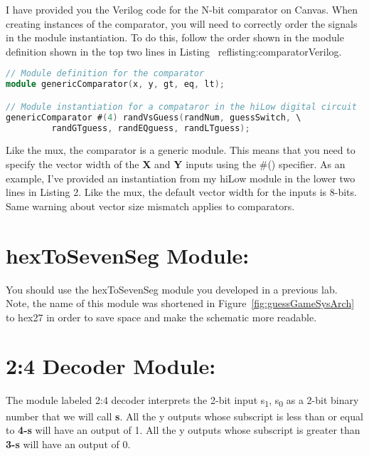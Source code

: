 I have provided you the Verilog code for the N-bit comparator on Canvas.
When creating instances of the comparator, you will need to correctly
order the signals in the module instantiation. To do this, follow the
order shown in the module definition shown in the top two lines in
Listing ~ref{listing:comparatorVerilog}.

\begin{lstlisting}[language=Verilog,
 caption={Top, the module definition for the comparator.  Bottom, module
 instantiation of a comparator in Figure~\ref{fig:comparatorSymbol}.},
 label={listing:comparatorVerilog},
 frame=single]
// Module definition for the comparator
module genericComparator(x, y, gt, eq, lt);

// Module instantiation for a compataror in the hiLow digital circuit
genericComparator #(4) randVsGuess(randNum, guessSwitch, \
		 randGTguess, randEQguess, randLTguess);
\end{lstlisting}

Like the mux, the comparator is a generic module. This means that you
need to specify the vector width of the \textbf{X} and \textbf{Y} inputs
using the \#() specifier. As an example, I've provided an instantiation
from my hiLow module in the lower two lines in Listing 2. Like the mux,
the default vector width for the inputs is 8-bits. Same warning about
vector size mismatch applies to comparators.

\hypertarget{hextosevenseg-module}{%
\section{hexToSevenSeg Module:}
\label{hextosevenseg-module}}
You should use the hexToSevenSeg module you developed in a
previous lab. Note, the name of this module was shortened in Figure~\ref{fig:guessGameSysArch}
to
hex27 in order to save space and make the schematic more
readable.

\hypertarget{decoder-module}{%
\section{2:4 Decoder Module:}
\label{decoder-module}}

The module labeled 2:4 decoder interprets the 2-bit input
s\textsubscript{1}, s\textsubscript{0} as a 2-bit binary number that we
will call \textbf{s}. All the y outputs whose subscript is less than or
equal to \textbf{4-s} will have an output of 1. All the y outputs whose
subscript is greater than \textbf{3-s} will have an output of 0.

